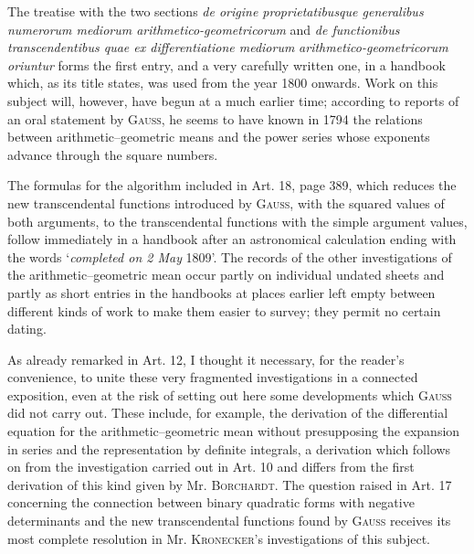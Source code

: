 \bigskip
The treatise with the two sections \textit{de origine proprietatibusque generalibus numerorum mediorum arithmetico-geometricorum} and \textit{de functionibus transcendentibus quae ex differentiatione mediorum}
\providecommand{\TStart}{\hspace*{.5em}}\providecommand{\TCont}{\hspace*{1em}}\providecommand{\TD}{\hspace{.3em}.\hspace{.3em}.}
\textit{arithmetico-geometricorum oriuntur} forms the first entry, and a very carefully written one, in a handbook which, as its title states, was used from the year 1800 onwards. Work on this subject will, however, have begun at a much earlier time; according to reports of an oral statement by \textsc{Gauss}, he seems to have known in 1794 the relations between arithmetic–geometric means and the power series whose exponents advance through the square numbers.

The formulas for the algorithm included in Art. 18, page 389, which reduces the new transcendental functions introduced by \textsc{Gauss}, with the squared values of both arguments, to the transcendental functions with the simple argument values, follow immediately in a handbook after an astronomical calculation ending with the words `\textit{completed on 2 May} 1809'. The records of the other investigations of the arithmetic–geometric mean occur partly on individual undated sheets and partly as short entries in the handbooks at places earlier left empty between different kinds of work to make them easier to survey; they permit no certain dating.

As already remarked in Art. 12, I thought it necessary, for the reader’s convenience, to unite these very fragmented investigations in a connected exposition, even at the risk of setting out here some developments which \textsc{Gauss} did not carry out. These include, for example, the derivation of the differential equation for the arithmetic–geometric mean without presupposing the expansion in series and the representation by definite integrals, a derivation which follows on from the investigation carried out in Art. 10 and differs from the first derivation of this kind given by Mr. \textsc{Borchardt}. The question raised in Art. 17 concerning the connection between binary quadratic forms with negative determinants and the new transcendental functions found by \textsc{Gauss} receives its most complete resolution in Mr. \textsc{Kronecker}’s investigations of this subject.

